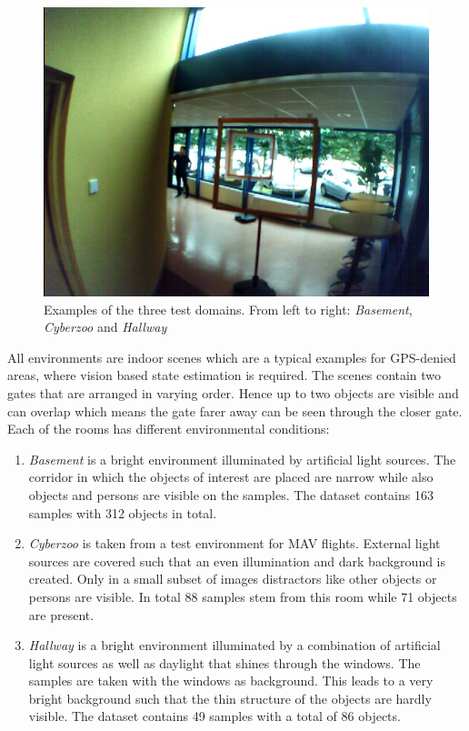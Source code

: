 \begin{figure}
\begin{minipage}{0.3\textwidth}
	\end{minipage}\hfill
	\begin{minipage}{0.3\textwidth}
		\includegraphics[width=\textwidth]{fig/hallway}
	\end{minipage}
	\caption{Examples of the three test domains. From left to right: \textit{Basement}, \textit{Cyberzoo} and \textit{Hallway}}
	\label{fig:example_real_set}
\end{figure}

All environments are indoor scenes which are a typical examples for GPS-denied areas, where vision based state estimation is required. The scenes contain two gates that are arranged in varying order. Hence up to two objects are visible and can overlap which means the gate farer away can be seen through the closer gate. Each of the rooms has different environmental conditions:
\begin{enumerate}
	\item \textit{Basement} is a bright environment illuminated by artificial light sources. The corridor in which the objects of interest are placed are narrow while also objects and persons are visible on the samples. The dataset contains 163 samples with 312 objects in total.
	\item \textit{Cyberzoo} is taken from a test environment for \ac{MAV} flights. External light sources are covered such that an even illumination and dark background is created. Only in a small subset of images distractors like other objects or persons are visible. In total 88 samples stem from this room while 71 objects are present.
	\item \textit{Hallway} is a bright environment illuminated by a combination of artificial light sources as well as daylight that shines through the windows. The samples are taken with the windows as background. This leads to a very bright background such that the thin structure of the objects are hardly visible. The dataset contains 49 samples with a total of 86 objects.
\end{enumerate}


